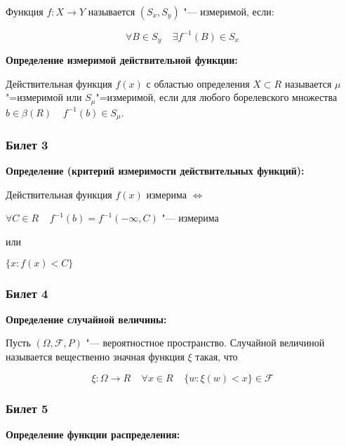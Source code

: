     Функция $f: X \rightarrow Y$ называется 
    $(S_x, S_y)$ "--- измеримой, если:

    \[
        \forall B \in S_y \;\;\;\; \exists f^{-1}
        (B) \in S_x
    \]
    \bigskip

\textbf{Определение измеримой действительной
функции:}
    \smallskip
    
    Действительная функция $f(x)$ с областью 
    определения $X \subset R$ называется 
    $\mu$"=измеримой или $S_{\mu}$"=измеримой,
    если для любого борелевского множества $b \in
    \beta(R) \;\;\;\; f^{-1}(b) \in S_{\mu}$.
    \bigskip

\subsubsection{Билет 3}

\textbf{Определение (критерий измеримости 
действительных функций):}
    \smallskip

    Действительная функция $f(x)$ измерима
    $\Leftrightarrow$

    \begin{center}

        $
            \forall C \in R \;\;\;\; f^{-1}(b) = 
            f^{-1}(-\infty, C)
        $ "--- измерима

        или 

        $\{x : f(x) < C\}$

    \end{center}
    \bigskip

\subsubsection{Билет 4}

\textbf{Определение случайной величины:}
    \smallskip

    Пусть $(\Omega, \mathcal{F}, P)$ "---
    вероятностное пространство. Случайной 
    величиной называется вещественно значная
    функция $\xi$ такая, что

    \[
        \xi : \Omega \rightarrow R \;\;\;\;
        \forall x \in R \;\;\;\; \{w: \xi(w) < x\}
        \in \mathcal{F}
    \]
    \bigskip

\subsubsection{Билет 5}

\textbf{Определение функции распределения:}
    \smallskip

